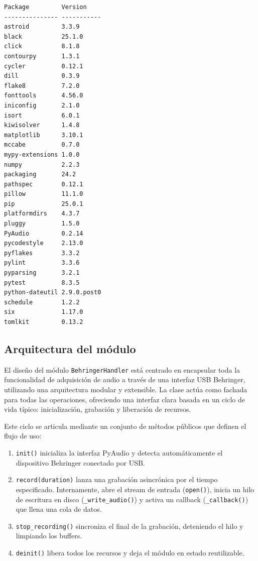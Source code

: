 \begin{verbatim}
Package         Version
--------------- -----------
astroid         3.3.9
black           25.1.0
click           8.1.8
contourpy       1.3.1
cycler          0.12.1
dill            0.3.9
flake8          7.2.0
fonttools       4.56.0
iniconfig       2.1.0
isort           6.0.1
kiwisolver      1.4.8
matplotlib      3.10.1
mccabe          0.7.0
mypy-extensions 1.0.0
numpy           2.2.3
packaging       24.2
pathspec        0.12.1
pillow          11.1.0
pip             25.0.1
platformdirs    4.3.7
pluggy          1.5.0
PyAudio         0.2.14
pycodestyle     2.13.0
pyflakes        3.3.2
pylint          3.3.6
pyparsing       3.2.1
pytest          8.3.5
python-dateutil 2.9.0.post0
schedule        1.2.2
six             1.17.0
tomlkit         0.13.2
\end{verbatim}


\subsection{Arquitectura del módulo}

El diseño del módulo \texttt{BehringerHandler} está centrado en encapsular toda la funcionalidad de adquisición de audio a través de una interfaz USB Behringer, utilizando una arquitectura modular y extensible. La clase actúa como fachada para todas las operaciones, ofreciendo una interfaz clara basada en un ciclo de vida típico: inicialización, grabación y liberación de recursos.

Este ciclo se articula mediante un conjunto de métodos públicos que definen el flujo de uso:

\begin{enumerate}
    \item \texttt{init()} inicializa la interfaz PyAudio y detecta automáticamente el dispositivo Behringer conectado por USB.
    \item \texttt{record(duration)} lanza una grabación asincrónica por el tiempo especificado. Internamente, abre el stream de entrada (\texttt{open()}), inicia un hilo de escritura en disco (\texttt{\_write\_audio()}) y activa un callback (\texttt{\_callback()}) que llena una cola de datos.
    \item \texttt{stop\_recording()} sincroniza el final de la grabación, deteniendo el hilo y limpiando los buffers.
    \item \texttt{deinit()} libera todos los recursos y deja el módulo en estado reutilizable.
\end{enumerate}

